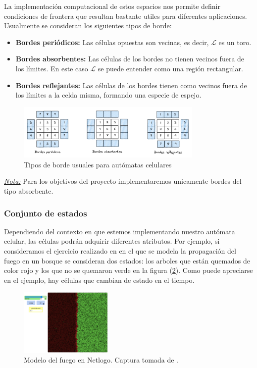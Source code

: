La implementación computacional de estos espacios nos permite definir condiciones de frontera que resultan bastante utiles para diferentes aplicaciones. Usualmente se consideran los siguientes tipos de borde:

\begin{itemize}
    \item \textbf{Bordes periódicos:} Las células opuestas son vecinas, es decir, $\mathcal{L}$ es un toro.
    \item \textbf{Bordes absorbentes:} Las células de los bordes no tienen vecinos fuera de los límites. En este caso $\mathcal{L}$ se puede entender como una región rectangular.
    \item \textbf{Bordes reflejantes:} Las células de los bordes tienen como vecinos fuera de los límites a la celda misma, formando una especie de espejo.
\end{itemize}

\begin{figure}[h]
  \centering
    \includegraphics[width=0.8\textwidth]{Imagenes/Tipos_de_borde.PNG}
  \caption{Tipos de borde usuales para autómatas celulares}
  \label{fig:Tipos de borde}
\end{figure}
    
\underline{\textit{Nota:}} Para los objetivos del proyecto implementaremos unicamente bordes del tipo absorbente.

\subsubsection{Conjunto de estados}

Dependiendo del contexto en que estemos implementando nuestro autómata celular, las células podrán adquirir diferentes atributos. Por ejemplo, si consideramos el ejercicio realizado en  \cite{NetLogoFireModel} en el que se modela la propagación del fuego en un bosque se consideran dos estados: los arboles que están quemados de color rojo y los que no se quemaron verde en la figura (\ref{fig:Fuego Netlogo}). Como puede apreciarse en el ejemplo, hay células que cambian de estado en el tiempo.

\begin{figure}[h]
  \centering
    \includegraphics[width=0.4\textwidth]{Imagenes/netlogoEx1.PNG}
  \caption{Modelo del fuego en Netlogo. Captura tomada de \cite{NetLogoFireModel}.}
  \label{fig:Fuego Netlogo}
\end{figure}

